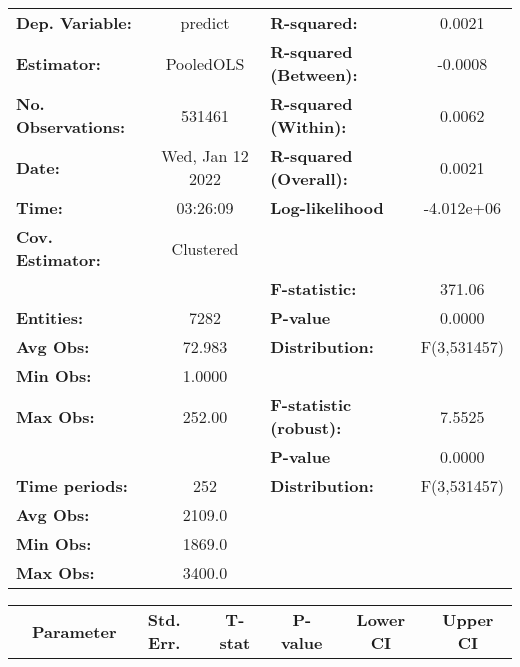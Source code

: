 \begin{center}
\begin{tabular}{lclc}
\toprule
\textbf{Dep. Variable:}    &      predict       & \textbf{  R-squared:         }   &      0.0021      \\
\textbf{Estimator:}        &     PooledOLS      & \textbf{  R-squared (Between):}  &     -0.0008      \\
\textbf{No. Observations:} &       531461       & \textbf{  R-squared (Within):}   &      0.0062      \\
\textbf{Date:}             &  Wed, Jan 12 2022  & \textbf{  R-squared (Overall):}  &      0.0021      \\
\textbf{Time:}             &      03:26:09      & \textbf{  Log-likelihood     }   &    -4.012e+06    \\
\textbf{Cov. Estimator:}   &     Clustered      & \textbf{                     }   &                  \\
\textbf{}                  &                    & \textbf{  F-statistic:       }   &      371.06      \\
\textbf{Entities:}         &        7282        & \textbf{  P-value            }   &      0.0000      \\
\textbf{Avg Obs:}          &       72.983       & \textbf{  Distribution:      }   &   F(3,531457)    \\
\textbf{Min Obs:}          &       1.0000       & \textbf{                     }   &                  \\
\textbf{Max Obs:}          &       252.00       & \textbf{  F-statistic (robust):} &      7.5525      \\
\textbf{}                  &                    & \textbf{  P-value            }   &      0.0000      \\
\textbf{Time periods:}     &        252         & \textbf{  Distribution:      }   &   F(3,531457)    \\
\textbf{Avg Obs:}          &       2109.0       & \textbf{                     }   &                  \\
\textbf{Min Obs:}          &       1869.0       & \textbf{                     }   &                  \\
\textbf{Max Obs:}          &       3400.0       & \textbf{                     }   &                  \\
\bottomrule
\end{tabular}
\begin{tabular}{lcccccc}
                & \textbf{Parameter} & \textbf{Std. Err.} & \textbf{T-stat} & \textbf{P-value} & \textbf{Lower CI} & \textbf{Upper CI}  \\

\end{tabular}
\end{center}
